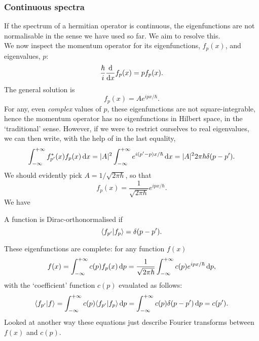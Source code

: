 \subsubsection{Continuous spectra}
If the spectrum of a hermitian operator is continuous, the eigenfunctions are 
not normalisable in the sense we have used so far. We aim to resolve this. \\
We now inspect the momentum operator for its eigenfunctions, $f_p(x)$, and eigenvalues, $p$: 
\begin{equation}
\frac{\hbar}{i}\diff*{f_p(x)}x=pf_p(x).
\end{equation}
The general solution is 
\begin{equation}
f_p(x)=Ae^{ipx/\hbar}.
\end{equation}
For any, even \textit{complex} values of $p$, these eigenfunctions are not 
square-integrable, hence the momentum operator has no eigenfunctions in Hilbert 
space, in the `traditional' sense. However, if we were to restrict ourselves to 
real eigenvalues, we can then write, with the help of  in the last equality, 
\begin{equation}
\intinf f^*_{p'}(x)f_p(x)\dx=|A|^2\intinf e^{i(p'-p)x/\hbar}\dx=|A|^2 2\pi\hbar\delta(p-p').
\end{equation}
We should evidently pick $A=1/\sqrt{2\pi\hbar}$, so that
\begin{equation}
f_p(x)=\frac{1}{\sqrt{2\pi\hbar}}e^{ipx/\hbar}.
\end{equation}
We have 
\begin{defi}
A function is Dirac-orthonormalised if
\begin{equation}
\langle f_{p'}|f_p\rangle=\delta(p-p').
\end{equation}
\end{defi}
\begin{prt}
These eigenfunctions are complete: for any function $f(x)$
\begin{equation}
f(x)=\intinf c(p)f_p(x)\dif p=\frac{1}{\sqrt{2\pi\hbar}}\intinf c(p)e^{ipx/\hbar}\dif p, 
\end{equation}
with the `coefficient' function $c(p)$ evaulated as follows: 
\begin{equation}
\lgl f_{p'}|f\rgl=\intinf c(p)\lgl f_{p'}|f_p\rgl\dif p=\intinf c(p)\delta(p-p')\dif p=c(p').
\end{equation}
Looked at another way these equations just describe Fourier transforms between $f(x)$ and $c(p)$. 
\end{prt}
